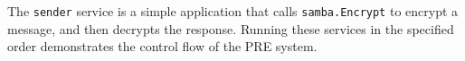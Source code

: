 The \texttt{sender} service is a simple application that calls \texttt{samba\-.En\-crypt} to encrypt a message, and then decrypts the response.
Running these services in the specified order demonstrates the control flow of the \SystemName PRE system.





